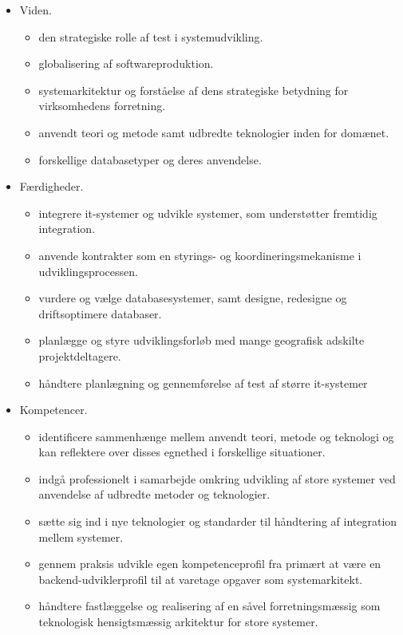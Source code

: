 \documentclass{report}
\begin{document}
\begin{itemize}
  \item Viden.
	\begin{itemize}
	\item den strategiske rolle af test i systemudvikling.
	\item globalisering af softwareproduktion.
	\item systemarkitektur og forståelse af dens strategiske betydning for virksomhedens forretning.
	\item anvendt teori og metode samt udbredte teknologier inden for domænet.
	\item forskellige databasetyper og deres anvendelse.
	\end{itemize}
  \item Færdigheder.
	\begin{itemize}
	\item integrere it-systemer og udvikle systemer, som understøtter fremtidig integration.
	\item anvende kontrakter som en styrings- og koordineringsmekanisme i udviklingsprocessen.
	\item vurdere og vælge databasesystemer, samt designe, redesigne og driftsoptimere databaser.
	\item planlægge og styre udviklingsforløb med mange geografisk adskilte projektdeltagere.
	\item håndtere planlægning og gennemførelse af test af større it-systemer
	\end{itemize}
  \item Kompetencer.
	\begin{itemize}
	\item identificere sammenhænge mellem anvendt teori, metode og teknologi og kan reflektere over disses egnethed i forskellige situationer.
	\item indgå professionelt i samarbejde omkring udvikling af store systemer ved anvendelse af udbredte metoder og teknologier.
	\item sætte sig ind i nye teknologier og standarder til håndtering af integration mellem systemer.
	\item gennem praksis udvikle egen kompetenceprofil fra primært at være en backend-udviklerprofil til at varetage opgaver som systemarkitekt.
	\item håndtere fastlæggelse og realisering af en såvel forretningsmæssig som teknologisk hensigtsmæssig arkitektur for store systemer.
	\end{itemize}
\end{itemize}



\end{document}
